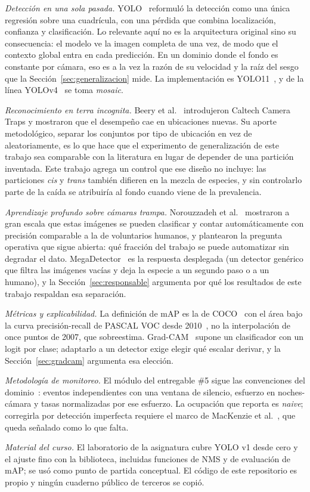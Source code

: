 \emph{Detección en una sola pasada.} YOLO~\cite{redmon2016you} reformuló la
detección como una única regresión sobre una cuadrícula, con una pérdida que
combina localización, confianza y clasificación. Lo relevante aquí no es la
arquitectura original sino su consecuencia: el modelo ve la imagen completa de
una vez, de modo que el contexto global entra en cada predicción. En un dominio
donde el fondo es constante por cámara, eso es a la vez la razón de su velocidad
y la raíz del sesgo que la Sección~\ref{sec:generalizacion} mide. La
implementación es YOLO11~\cite{ultralytics2024yolo11}, y de la línea
YOLOv4~\cite{bochkovskiy2020yolov4} se toma \emph{mosaic}.

\emph{Reconocimiento en terra incognita.} Beery
et al.~\cite{beery2018recognition} introdujeron Caltech Camera Traps y mostraron
que el desempeño cae en ubicaciones nuevas. Su aporte metodológico, separar los
conjuntos por tipo de ubicación en vez de aleatoriamente, es lo que hace que el
experimento de generalización de este trabajo sea comparable con la literatura
en lugar de depender de una partición inventada. Este trabajo agrega un control
que ese diseño no incluye: las particiones \emph{cis} y \emph{trans} también
difieren en la mezcla de especies, y sin controlarlo parte de la caída se
atribuiría al fondo cuando viene de la prevalencia.

\emph{Aprendizaje profundo sobre cámaras trampa.} Norouzzadeh
et al.~\cite{norouzzadeh2018automatically} mostraron a gran escala que estas
imágenes se pueden clasificar y contar automáticamente con precisión comparable
a la de voluntarios humanos, y plantearon la pregunta operativa que sigue
abierta: qué fracción del trabajo se puede automatizar sin degradar el dato.
MegaDetector~\cite{beery2019efficient} es la respuesta desplegada (un detector
genérico que filtra las imágenes vacías y deja la especie a un segundo paso o a
un humano), y la Sección~\ref{sec:responsable} argumenta por qué los resultados
de este trabajo respaldan esa separación.

\emph{Métricas y explicabilidad.} La definición de mAP es la de
COCO~\cite{lin2014microsoft} con el área bajo la curva precisión-recall de
PASCAL VOC desde 2010~\cite{everingham2010pascal}, no la interpolación de once
puntos de 2007, que sobreestima. Grad-CAM~\cite{selvaraju2017grad} supone un
clasificador con un logit por clase; adaptarlo a un detector exige elegir qué
escalar derivar, y la Sección~\ref{sec:gradcam} argumenta esa elección.

\emph{Metodología de monitoreo.} El módulo del entregable \#5 sigue las
convenciones del dominio~\cite{oconnell2011camera}: eventos independientes con
una ventana de silencio, esfuerzo en noches-cámara y tasas normalizadas por ese
esfuerzo. La ocupación que reporta es \emph{naive}; corregirla por detección
imperfecta requiere el marco de MacKenzie et
al.~\cite{mackenzie2002estimating}, que queda señalado como lo que falta.

\emph{Material del curso.} El laboratorio de la asignatura cubre YOLO v1 desde
cero y el ajuste fino con la biblioteca, incluidas funciones de NMS y de
evaluación de mAP; se usó como punto de partida conceptual. El código de este
repositorio es propio y ningún cuaderno público de terceros se copió.
